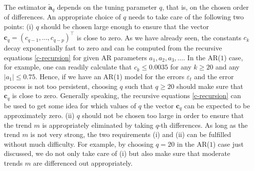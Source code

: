 The estimator $\widetilde{\boldsymbol{a}}_q$ depends on the tuning parameter $q$, that is, on the chosen order of differences. %
An appropriate choice of $q$ needs to take care of the following two points: 
(i) $q$ should be chosen large enough to ensure that the vector $\boldsymbol{c}_q = (c_{q-1},\dots,c_{q-p})^\top$ is close to zero. As we have already seen, the constants $c_k$ decay exponentially fast to zero and can be computed from the recursive equations \eqref{c-recursion} for given AR parameters $a_1,a_2,a_3,\ldots$. In the AR($1$) case, for example, one can readily calculate that $c_k \le 0.0035$ for any $k \ge 20$ and any $|a_1| \le 0.75$. Hence, if we have an AR($1$) model for the errors $\varepsilon_t$ and the error process is not too persistent, choosing $q$ such that $q \ge 20$ should make sure that $\boldsymbol{c}_q$ is close to zero. Generally speaking, the recursive equations \eqref{c-recursion} can be used to get some idea for which values of $q$ the vector $\boldsymbol{c}_q$ can be expected to be approximately zero. 
(ii) $q$ should not be chosen too large in order to ensure that the trend $m$ is appropriately eliminated by taking $q$-th differences. As long as the trend $m$ is not very strong, the two requirements (i) and (ii) can be fulfilled without much difficulty. For example, by choosing $q = 20$ in the AR($1$) case just discussed, we do not only take care of (i) but also make sure that moderate trends $m$ are differenced out appropriately. 


